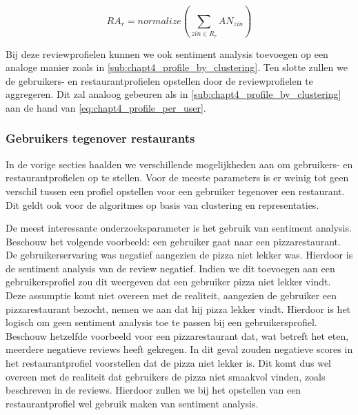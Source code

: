 \begin{equation}
\label{eq:chapt4_profile_per_review_approx}
    RA_{r} = normalize(\sum_{zin \in R_r}AN_{zin})
\end{equation}

Bij deze reviewprofielen kunnen we ook sentiment analysis toevoegen op een analoge manier zoals in \autoref{sub:chapt4_profile_by_clustering}. Ten slotte zullen we de gebruikers- en restaurantprofielen opstellen door de reviewprofielen te aggregeren. Dit zal analoog gebeuren als in \autoref{sub:chapt4_profile_by_clustering} aan de hand van \autoref{eq:chapt4_profile_per_user}.

\subsubsection{Gebruikers tegenover restaurants}
\label{sub:chapt4_users_vs_restaurants}
In de vorige secties haalden we verschillende mogelijkheden aan om gebruikers- en restaurantprofielen op te stellen. Voor de meeste parameters is er weinig tot geen verschil tussen een profiel opstellen voor een gebruiker tegenover een restaurant. Dit geldt ook voor de algoritmes op basis van clustering en representaties.

De meest interessante onderzoeksparameter is het gebruik van sentiment analysis. Beschouw het volgende voorbeeld:\newline
een gebruiker gaat naar een pizzarestaurant. De gebruikerservaring was negatief aangezien de pizza niet lekker was. Hierdoor is de sentiment analysis van de review negatief. Indien we dit toevoegen aan een gebruikersprofiel zou dit weergeven dat een gebruiker pizza niet lekker vindt. Deze assumptie komt niet overeen met de realiteit, aangezien de gebruiker een pizzarestaurant bezocht, nemen we aan dat hij pizza lekker vindt. Hierdoor is het logisch om geen sentiment analysis toe te passen bij een gebruikersprofiel. \newline
Beschouw hetzelfde voorbeeld voor een pizzarestaurant dat, wat betreft het eten, meerdere negatieve reviews heeft gekregen. In dit geval zouden negatieve scores in het restaurantprofiel voorstellen dat de pizza niet lekker is. Dit komt dus wel overeen met de realiteit dat gebruikers de pizza niet smaakvol vinden, zoals beschreven in de reviews. Hierdoor zullen we bij het opstellen van een restaurantprofiel wel gebruik maken van sentiment analysis.

